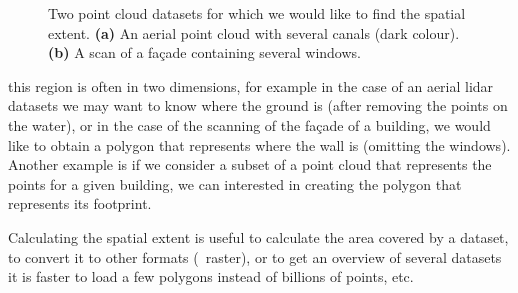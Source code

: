 \begin{figure}
\begin{subfigure}[b]{0.33\linewidth}
    \caption{}
  \end{subfigure}
\caption{Two point cloud datasets for which we would like to find the spatial extent. \textbf{(a)} An aerial point cloud with several canals (dark colour). \textbf{(b)} A scan of a façade containing several windows.}
\end{figure}
this region is often in two dimensions, for example in the case of an aerial lidar datasets we may want to know where the ground is (after removing the points on the water), or in the case of the scanning of the façade of a building, we would like to obtain a polygon that represents where the wall is (omitting the windows).
Another example is if we consider a subset of a point cloud that represents the points for a given building, we can interested in creating the polygon that represents its footprint.

%

Calculating the spatial extent is useful to calculate the area covered by a dataset, to convert it to other formats (\eg\ raster), or to get an overview of several datasets it is faster to load a few polygons instead of billions of points, etc.

%

